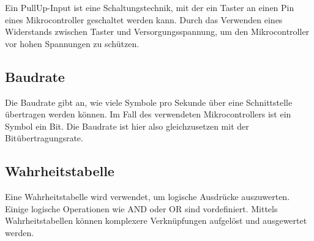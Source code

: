 Ein PullUp-Input ist eine Schaltungstechnik, mit der ein Taster an einen Pin eines Mikrocontroller geschaltet werden kann.
Durch das Verwenden eines Widerstands zwischen Taster und Versorgungsspannung, um den Mikrocontroller vor hohen Spannungen zu schützen.

\subsection{Baudrate}
\label{subsec:baudrate}

Die Baudrate gibt an, wie viele Symbole pro Sekunde über eine Schnittstelle übertragen werden können.
Im Fall des verwendeten Mikrocontrollers ist ein Symbol ein Bit.
Die Baudrate ist hier also gleichzusetzen mit der Bitübertragungsrate.

\subsection{Wahrheitstabelle}
\label{subsec:wahrheitstabelle}

Eine Wahrheitstabelle wird verwendet, um logische Ausdrücke auszuwerten.
Einige logische Operationen wie AND oder OR sind vordefiniert.
Mittels Wahrheitstabellen können komplexere Verknüpfungen aufgelöst und ausgewertet werden.

